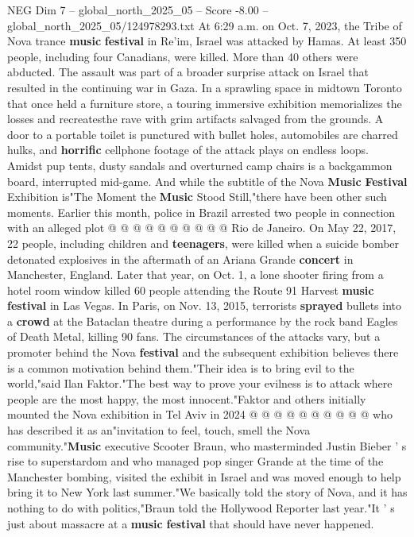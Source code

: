 \begin{textsample}{NEG Dim 7 – global\_north\_2025\_05 – Score -8.00 – global\_north\_2025\_05/124978293.txt}  \label{ex:f7_neg_107}
At 6:29 a.m. on Oct. 7, 2023, the Tribe of Nova trance \textbf{music} \textbf{festival} in Re'im, Israel was attacked by Hamas.
At least 350 people, including four Canadians, were killed.
More than 40 others were abducted.
The assault was part of a broader surprise attack on Israel that resulted in the continuing war in Gaza.
In a sprawling space in midtown Toronto that once held a furniture store, a touring immersive exhibition memorializes the losses and recreatesthe rave with grim artifacts salvaged from the grounds.
A door to a portable toilet is punctured with bullet holes, automobiles are charred hulks, and \textbf{horrific} cellphone footage of the attack plays on endless loops.
Amidst pup tents, dusty sandals and overturned camp chairs is a backgammon board, interrupted mid-game.
And while the subtitle of the Nova \textbf{Music} \textbf{Festival} Exhibition is"The Moment the \textbf{Music} Stood Still,"there have been other such moments.
Earlier this month, police in Brazil arrested two people in connection with an alleged plot @ @ @ @ @ @ @ @ @ @ Rio de Janeiro.
On May 22, 2017, 22 people, including children and \textbf{teenagers}, were killed when a suicide bomber detonated explosives in the aftermath of an Ariana Grande \textbf{concert} in Manchester, England.
Later that year, on Oct. 1, a lone shooter firing from a hotel room window killed 60 people attending the Route 91 Harvest \textbf{music} \textbf{festival} in Las Vegas.
In Paris, on Nov. 13, 2015, terrorists \textbf{sprayed} bullets into a \textbf{crowd} at the Bataclan theatre during a performance by the rock band Eagles of Death Metal, killing 90 fans.
The circumstances of the attacks vary, but a promoter behind the Nova \textbf{festival} and the subsequent exhibition believes there is a common motivation behind them."Their idea is to bring evil to the world,"said Ilan Faktor."The best way to prove your evilness is to attack where people are the most happy, the most innocent."Faktor and others initially mounted the Nova exhibition in Tel Aviv in 2024 @ @ @ @ @ @ @ @ @ @ who has described it as an"invitation to feel, touch, smell the Nova community."\textbf{Music} executive Scooter Braun, who masterminded Justin Bieber ' s rise to superstardom and who managed pop singer Grande at the time of the Manchester bombing, visited the exhibit in Israel and was moved enough to help bring it to New York last summer."We basically told the story of Nova, and it has nothing to do with politics,"Braun told the Hollywood Reporter last year."It ' s just about massacre at a \textbf{music} \textbf{festival} that should have never happened.

\end{textsample}
